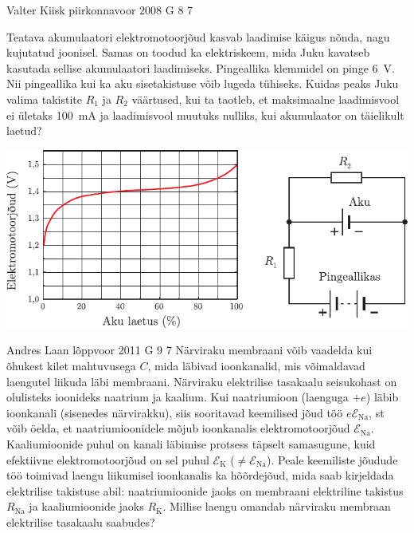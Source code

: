 \documentclass[11pt, twoside]{article}
\begin{document}
{%
{Valter Kiisk} %
{piirkonnavoor} %
{2008} %
{G 8} %
{7} %
{
\ifStatement
Teatava akumulaatori elektromotoorjõud kasvab laadimise käigus nõnda, nagu kujutatud joonisel. Samas on toodud ka elektriskeem, mida Juku kavatseb kasutada sellise akumulaatori laadimiseks. Pingeallika klemmidel on pinge \SI{6}{V}. Nii pingeallika kui ka aku sisetakistuse võib lugeda tühiseks. Kuidas peaks Juku valima takistite $R_1$ ja $R_2$ väärtused, kui ta taotleb, et maksimaalne laadimisvool ei ületaks \SI{100}{mA} ja laadimisvool muutuks nulliks, kui akumulaator on täielikult laetud? 

\begin{center}
	\includegraphics[width=\linewidth]{2008-v2g-08-yl}
\end{center}
\fi
}

{Andres Laan} %
{lõppvoor} %
{2011} %
{G 9} %
{7} %
{
\ifStatement
Närviraku membraani võib vaadelda kui õhukest kilet mahtuvusega $C$, mida läbivad ioonkanalid, mis võimaldavad laengutel liikuda läbi
membraani. Närviraku elektrilise tasakaalu seisukohast on olulisteks ioonideks
naatrium ja kaalium. Kui naatriumioon (laenguga $+e$) läbib ioonkanali (sisenedes närvirakku), siis sooritavad keemilised jõud töö $e\mathcal{E}_{\mathrm{Na}}$, st võib öelda, et
naatriumioonidele mõjub ioonkanalis elektromotoorjõud $\mathcal{E}_{\mathrm{Na}}$. Kaaliumioonide
puhul on kanali läbimise protsess täpselt samasugune, kuid efektiivne elektromotoorjõud on sel puhul $\mathcal{E}_{\mathrm{K}}$ ($\neq \mathcal{E}_{\mathrm{Na}}$). Peale keemiliste jõudude töö toimivad
laengu liikumisel ioonkanalis ka hõõrdejõud, mida saab kirjeldada elektrilise
takistuse abil: naatriumioonide jaoks on membraani elektriline takistus $R_{\mathrm{Na}}$ ja kaaliumioonide jaoks $R_{\mathrm{K}}$. Millise laengu omandab närviraku membraan
elektrilise tasakaalu saabudes? 
\fi
}

}
\end{document}

